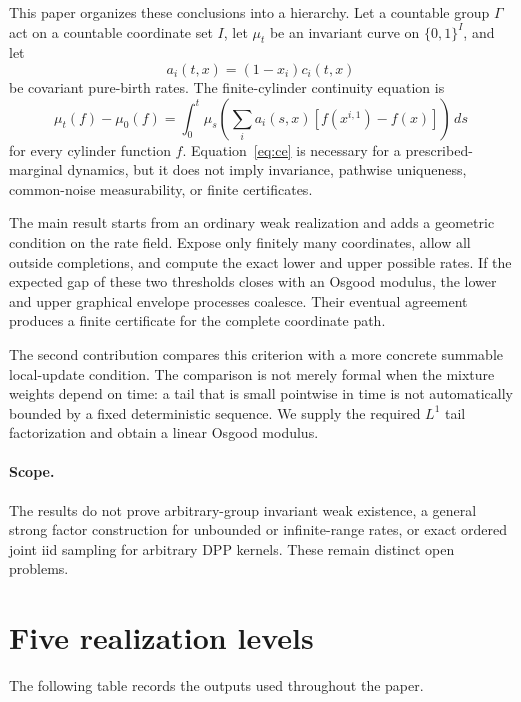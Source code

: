\documentclass[11pt]{article}
\theoremstyle{definition}
\theoremstyle{remark}
\newcommand{\1}{\mathbf{1}}
\begin{document}
This paper organizes these conclusions into a hierarchy.  Let a countable
group $\Gamma$ act on a countable coordinate set $I$, let
$\mu_t$ be an invariant curve on $\{0,1\}^I$, and let
\[
 a_i(t,x)=(1-x_i)c_i(t,x)
\]
be covariant pure-birth rates.  The finite-cylinder continuity equation is
\begin{equation}
 \mu_t(f)-\mu_0(f)
 =\int_0^t\mu_s\!\left(\sum_i a_i(s,x)
 [f(x^{i,1})-f(x)]\right)\,ds
 \label{eq:ce}
\end{equation}
for every cylinder function $f$.  Equation~\eqref{eq:ce} is necessary for a
prescribed-marginal dynamics, but it does not imply invariance, pathwise
uniqueness, common-noise measurability, or finite certificates.

The main result starts from an ordinary weak realization and adds a geometric
condition on the rate field.  Expose only finitely many coordinates, allow all
outside completions, and compute the exact lower and upper possible rates.
If the expected gap of these two thresholds closes with an Osgood modulus, the
lower and upper graphical envelope processes coalesce.  Their eventual
agreement produces a finite certificate for the complete coordinate path.

The second contribution compares this criterion with a more concrete
summable local-update condition.  The comparison is not merely formal when
the mixture weights depend on time: a tail that is small pointwise in time is
not automatically bounded by a fixed deterministic sequence.  We supply the
required $L^1$ tail factorization and obtain a linear Osgood modulus.

\paragraph{Scope.}
The results do not prove arbitrary-group invariant weak existence, a general
strong factor construction for unbounded or infinite-range rates, or exact
ordered joint iid sampling for arbitrary DPP kernels.  These remain distinct
open problems.

\section{Five realization levels}

The following table records the outputs used throughout the paper.
\end{document}
